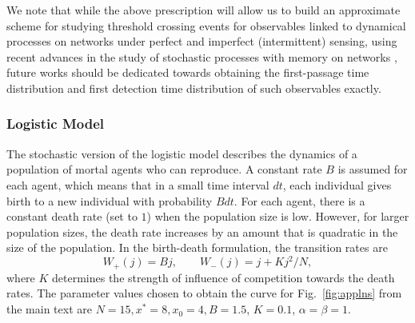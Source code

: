 We note that while the above prescription will allow us to build an approximate scheme for studying threshold crossing events for observables linked to dynamical processes on networks under perfect and imperfect (intermittent) sensing, using recent advances in the study of stochastic processes with memory on networks \cite{hartich2021emergent}, future works should be dedicated towards obtaining the first-passage time distribution and first detection time distribution of such observables exactly. 



 \subsubsection*{Logistic Model}
The stochastic version of the logistic model describes the dynamics of a population of mortal agents who can reproduce. A constant rate $B$ is assumed for each agent, which means that in a small time interval $dt$, each individual gives birth to a new individual with probability $Bdt$. For each agent, there is a constant death rate (set to $1$) when the population size is low. However, for larger population sizes, the death rate increases by an amount that is quadratic in the size of the population. In the birth-death formulation, the transition rates are 
 \begin{equation}
 W_+(j) = B j, \quad \quad W_-(j) = j + K j^2/N,
 \end{equation}
 where $K$ determines the strength of influence of competition towards the death rates. The parameter values chosen to obtain the curve for Fig.~\ref{fig:applns} from the main text are $N=15, x^*= 8, x_0 = 4, B=1.5$, $K=0.1$, $\alpha=\beta=1$. 
 
